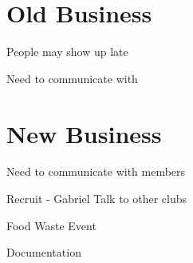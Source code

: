 \documentclass[11pt]{meetingmins}
\begin{document}
\section{Old Business}
\begin{items}
\item People may show up late
\item Need to communicate with 
\priormins
\end{items}

\section{New Business}
\begin{items}
\item Need to communicate with members
\item Recruit - Gabriel Talk to other clubs 
\item Food Waste Event 
\item Documentation
\end{items}

\vspace{1em}
\end{document}
